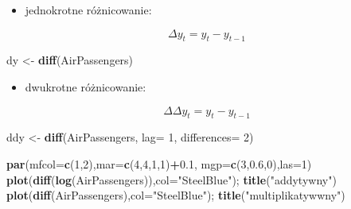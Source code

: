 \documentclass[polish,]{book}
\newenvironment{Shaded}{\begin{snugshade}}{\end{snugshade}}
\newcommand{\DataTypeTok}[1]{\textcolor[rgb]{0.13,0.29,0.53}{#1}}
\newcommand{\DecValTok}[1]{\textcolor[rgb]{0.00,0.00,0.81}{#1}}
\newcommand{\FloatTok}[1]{\textcolor[rgb]{0.00,0.00,0.81}{#1}}
\newcommand{\KeywordTok}[1]{\textcolor[rgb]{0.13,0.29,0.53}{\textbf{#1}}}
\newcommand{\NormalTok}[1]{#1}
\newcommand{\OperatorTok}[1]{\textcolor[rgb]{0.81,0.36,0.00}{\textbf{#1}}}
\newcommand{\StringTok}[1]{\textcolor[rgb]{0.31,0.60,0.02}{#1}}
\providecommand{\tightlist}{%
  \setlength{\itemsep}{0pt}\setlength{\parskip}{0pt}}
\begin{document}
\begin{itemize}
\tightlist
\item
  jednokrotne różnicowanie:
\end{itemize}

\begin{equation}
\Delta y_t=y_t-y_{t-1}
\label{eq:wz01}
\end{equation}

\begin{Shaded}
\begin{Highlighting}[]
\NormalTok{dy <-}\StringTok{ }\KeywordTok{diff}\NormalTok{(AirPassengers)}
\end{Highlighting}
\end{Shaded}

\begin{itemize}
\tightlist
\item
  dwukrotne różnicowanie:
\end{itemize}

\begin{equation}
\Delta\Delta y_t=y_t-y_{t-1}
\label{eq:wz02}
\end{equation}

\begin{Shaded}
\begin{Highlighting}[]
\NormalTok{ddy <-}\StringTok{ }\KeywordTok{diff}\NormalTok{(AirPassengers, }\DataTypeTok{lag=} \DecValTok{1}\NormalTok{, }\DataTypeTok{differences=} \DecValTok{2}\NormalTok{)}
\end{Highlighting}
\end{Shaded}

\begin{Shaded}
\begin{Highlighting}[]
\KeywordTok{par}\NormalTok{(}\DataTypeTok{mfcol=}\KeywordTok{c}\NormalTok{(}\DecValTok{1}\NormalTok{,}\DecValTok{2}\NormalTok{),}\DataTypeTok{mar=}\KeywordTok{c}\NormalTok{(}\DecValTok{4}\NormalTok{,}\DecValTok{4}\NormalTok{,}\DecValTok{1}\NormalTok{,}\DecValTok{1}\NormalTok{)}\OperatorTok{+}\FloatTok{0.1}\NormalTok{, }\DataTypeTok{mgp=}\KeywordTok{c}\NormalTok{(}\DecValTok{3}\NormalTok{,}\FloatTok{0.6}\NormalTok{,}\DecValTok{0}\NormalTok{),}\DataTypeTok{las=}\DecValTok{1}\NormalTok{)}
\KeywordTok{plot}\NormalTok{(}\KeywordTok{diff}\NormalTok{(}\KeywordTok{log}\NormalTok{(AirPassengers)),}\DataTypeTok{col=}\StringTok{"SteelBlue"}\NormalTok{); }\KeywordTok{title}\NormalTok{(}\StringTok{"addytywny"}\NormalTok{)}
\KeywordTok{plot}\NormalTok{(}\KeywordTok{diff}\NormalTok{(AirPassengers),}\DataTypeTok{col=}\StringTok{"SteelBlue"}\NormalTok{); }\KeywordTok{title}\NormalTok{(}\StringTok{"multiplikatywwny"}\NormalTok{)}
\end{Highlighting}
\end{Shaded}
\end{document}
